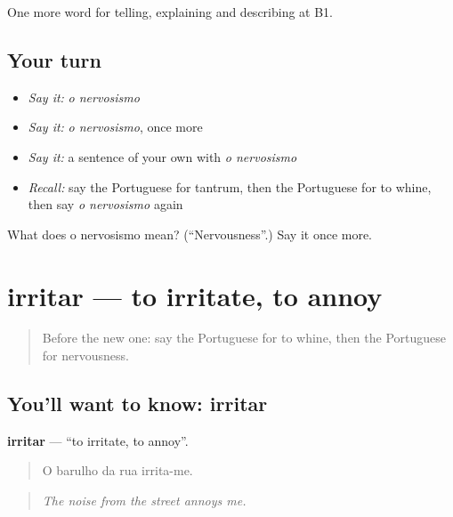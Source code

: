 \begin{grammarlens}[title={What you've built}]
One more word for telling, explaining and describing at B1.
\end{grammarlens}

\subsection*{Your turn}
\begin{itemize}
\raggedright
  \item \emph{Say it:} \emph{o nervosismo}
  \item \emph{Say it:} \emph{o nervosismo}, once more
  \item \emph{Say it:} a sentence of your own with \emph{o nervosismo}
  \item \emph{Recall:} say the Portuguese for tantrum, then the Portuguese for to whine, then say \emph{o nervosismo} again
\end{itemize}

\begin{tcolorbox}[breakable,colback=teal!4,colframe=teal!35!black,title={Before you move on}]
What does o nervosismo mean? (\textquotedblleft{}Nervousness\textquotedblright{}.) Say it once more.
\end{tcolorbox}
\section[irritar]{irritar — to irritate, to annoy}

\label{lesson:PT-C475-irritar}



\begin{quote}
Before the new one: say the Portuguese for to whine, then the Portuguese for nervousness.
\end{quote}

\subsection*{You'll want to know: irritar}
\textbf{irritar} — \textquotedblleft{}to irritate, to annoy\textquotedblright{}.

\begin{quote}
O barulho da rua irrita-me.
\end{quote}

\begin{quote}
\emph{The noise from the street annoys me.}
\end{quote}

